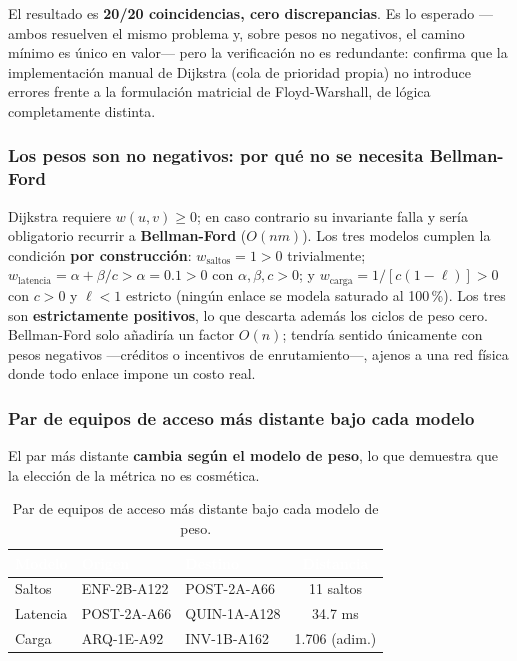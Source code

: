 \documentclass[11pt, a4paper]{article}
\newcommand{\encabezado}[1]{%
    \cellcolor{tabhead}\textcolor{white}{\textbf{#1}}}
\begin{document}
El resultado es \textbf{20/20 coincidencias, cero discrepancias}. Es lo
esperado —ambos resuelven el mismo problema y, sobre pesos no negativos, el
camino mínimo es único en valor— pero la verificación no es redundante:
confirma que la implementación manual de Dijkstra (cola de prioridad propia)
no introduce errores frente a la formulación matricial de Floyd-Warshall,
de lógica completamente distinta.

\subsubsection*{Los pesos son no negativos: por qué no se necesita Bellman-Ford}

Dijkstra requiere $w(u,v) \geq 0$; en caso contrario su invariante falla y
sería obligatorio recurrir a \textbf{Bellman-Ford} ($O(nm)$). Los tres
modelos cumplen la condición \textbf{por construcción}:
$w_{\text{saltos}} = 1 > 0$ trivialmente;
$w_{\text{latencia}} = \alpha + \beta/c > \alpha = 0.1 > 0$ con
$\alpha,\beta,c > 0$; y $w_{\text{carga}} = 1/[c(1-\ell)] > 0$ con $c>0$ y
$\ell<1$ estricto (ningún enlace se modela saturado al 100\,\%). Los tres
son \textbf{estrictamente positivos}, lo que descarta además los ciclos de
peso cero. Bellman-Ford solo añadiría un factor $O(n)$; tendría sentido
únicamente con pesos negativos —créditos o incentivos de enrutamiento—,
ajenos a una red física donde todo enlace impone un costo real.

\subsubsection*{Par de equipos de acceso más distante bajo cada modelo}

El par más distante \textbf{cambia según el modelo de peso}, lo que
demuestra que la elección de la métrica no es cosmética.

\begin{table}[htbp]
\centering
\caption{Par de equipos de acceso más distante bajo cada modelo de peso.}
\label{tab:par_distante}
\small
\begin{tabular}{L{1.8cm} L{3.1cm} L{3.1cm} c}
    \toprule
    \encabezado{Modelo} & \encabezado{Origen} & \encabezado{Destino} &
    \encabezado{Distancia} \\
    \midrule
    Saltos   & ENF-2B-A122 & POST-2A-A66  & 11 saltos \\
    Latencia & POST-2A-A66 & QUIN-1A-A128 & 34.7 ms \\
    Carga    & ARQ-1E-A92  & INV-1B-A162  & 1.706 (adim.) \\
    \bottomrule
\end{tabular}
\end{table}
\end{document}
